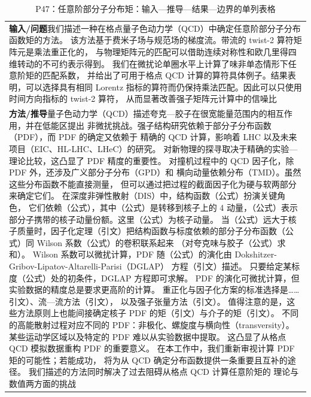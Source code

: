 \documentclass[UTF8,11pt,oneside]{ctexbook}
\begin{document}
\begin{table}[htbp]
  \centering
  \caption*{P47：任意阶部分子分布矩：输入—推导—结果—边界的单列表格}
  \small
  \begin{tabular}{@{}p{}@{}}
    \toprule
    \textbf{输入/问题}\quad 我们描述一种在格点量子色动力学（QCD）中确定任意阶部分子分布函数矩的方法。 该方法基于费米子场与规范场的梯度流。带流的 twist-2 算符矩阵元是乘法重正化的， 与物理矩阵元的匹配可以借助连续对称性和欧几里得四维转动的不可约表示得到。 我们在微扰论单圈水平上计算了味非单态情形下任意阶矩的匹配系数， 并给出了可用于格点 QCD 计算的算符具体例子。结果表明，可以选择具有相同 Lorentz 指标的算符而仍保持乘法匹配。因此可以只使用时间方向指标的 twist-2 算符， 从而显著改善强子矩阵元计算中的信噪比 \\
    \textbf{方法/推导}\quad 量子色动力学（QCD）描述夸克—胶子在很宽能量范围内的相互作用，并在低能区提出 非微扰挑战。强子结构研究依赖于部分子分布函数（PDF），而 PDF 的确定又依赖于 精确的 QCD 计算，影响着 LHC 以及未来项目（EIC、HL-LHC、LHeC）的研究。 对新物理的探寻取决于精确的实验—理论比较，这凸显了 PDF 精度的重要性。 对撞机过程中的 QCD 因子化，除 PDF 外，还涉及广义部分子分布（GPD）和 横向动量依赖分布（TMD）。虽然这些分布函数不能直接测量， 但可以通过把过程的截面因子化为硬与软两部分来确定它们。 在深度非弹性散射（DIS）中，结构函数（公式）扮演关键角色， 它们依赖（公式），其中（公式）是转移到核子上的 4 动量，（公式）表示部分子携带的核子动量份额。这里（公式）为核子动量。 当（公式）远大于核子质量时，因子化定理（引文）把结构函数与标度依赖的部分子分布函数（公式）同 Wilson 系数（公式）的卷积联系起来 （对夸克味与胶子（公式）求和）。 Wilson 系数可以微扰计算，PDF 随（公式）的演化由 Dokshitzer-Gribov-Lipatov-Altarelli-Parisi（DGLAP） 方程（引文）描述。 只要给定某标度（公式）处的初条件，DGLAP 方程即可求解。 PDF 的演化可微扰计算，但实验数据的精度总是要求更高阶的计算。 重正化与因子化方案的标准选择是……引文）、流—流方法（引文）， 以及强子张量方法（引文）。 值得注意的是，这些方法原则上也能间接确定核子 PDF 的矩（引文）与介子的矩（引文）。 不同的高能散射过程对应不同的 PDF：非极化、螺旋度与横向性（transversity）。 某些运动学区域以及特定的 PDF 难以从实验数据中提取。 这凸显了从格点 QCD 模拟数据重构 PDF 的重要意义。 在本工作中，我们重新审视计算 PDF 矩的可能性；若能成功， 将为从 QCD 确定分布函数提供一条重要且互补的途径。 我们描述的方法同时解决了过去阻碍从格点 QCD 计算任意阶矩的 理论与数值两方面的挑战 \\

\end{tabular}
\end{table}
\end{document}
